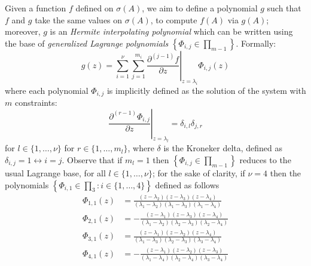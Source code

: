 Given a function $f$ defined on $\sigma(A)$, we aim to define a polynomial $g$
such that $f$ and $g$ take the same values on $\sigma(A)$, to compute $f(A)$
via $g(A)$; moreover, $g$ is an \emph{Hermite interpolating polynomial} which
can be written using the base of \textit{generalized Lagrange polynomials}
$\left\lbrace \Phi_{i,j}\in\prod_{m-1} \right\rbrace$. Formally:
\begin{displaymath}
g(z) = \sum_{i=1}^{\nu}{\sum_{j=1}^{m_{i}}{ \left.
\frac{\partial^{(j-1)}{f}}{\partial{z}} \right|_{z=\lambda_{i}}\Phi_{i,j}(z) }}
\end{displaymath}
where each polynomial $\Phi_{i,j}$ is implicitly defined as the solution of the
system with $m$ constraints:
\begin{displaymath}
    \left. \frac{\partial^{(r-1)}{\Phi_{i,j}}}{\partial{z}} \right|_{z=\lambda_{l}} = \delta_{i,l}\delta_{j,r}
\end{displaymath}
for $l\in \lbrace 1, \ldots, \nu \rbrace$ for $r \in \lbrace 1, \ldots, m_{l}
\rbrace$, where $\delta$ is the Kroneker delta, defined as $\delta_{i,j}=1
\leftrightarrow i=j$.  Observe that if $m_{l}=1$  then $\left\lbrace \Phi_{i,j}\in\prod_{m-1} \right\rbrace$
reduces to the usual Lagrange base, for all $l\in\lbrace 1, \ldots, \nu\rbrace$;
for the sake of clarity, if $\nu=4$ then the polynomials $\left\lbrace \Phi_{i,1}\in\prod_{3}:i\in\lbrace1,\ldots,4\rbrace \right\rbrace$
defined as follows
\begin{displaymath}
\begin{split}
\Phi_{ 1, 1 }{\left (z \right )} &= \frac{\left(z - \lambda_{2}\right)
\left(z - \lambda_{3}\right) \left(z - \lambda_{4}\right)}{\left(\lambda_{1} -
\lambda_{2}\right) \left(\lambda_{1} - \lambda_{3}\right) \left(\lambda_{1} -
\lambda_{4}\right)} \\ 
\Phi_{ 2, 1 }{\left (z \right )} &= - \frac{\left(z -
\lambda_{1}\right) \left(z - \lambda_{3}\right) \left(z -
\lambda_{4}\right)}{\left(\lambda_{1} - \lambda_{2}\right) \left(\lambda_{2} -
\lambda_{3}\right) \left(\lambda_{2} - \lambda_{4}\right)} \\ 
\Phi_{ 3, 1 }{\left (z \right )} &= \frac{\left(z - \lambda_{1}\right) \left(z -
\lambda_{2}\right) \left(z - \lambda_{4}\right)}{\left(\lambda_{1} -
\lambda_{3}\right) \left(\lambda_{2} - \lambda_{3}\right) \left(\lambda_{3} -
\lambda_{4}\right)} \\ 
\Phi_{ 4, 1 }{\left (z \right )} &= - \frac{\left(z -
\lambda_{1}\right) \left(z - \lambda_{2}\right) \left(z -
\lambda_{3}\right)}{\left(\lambda_{1} - \lambda_{4}\right) \left(\lambda_{2} -
\lambda_{4}\right) \left(\lambda_{3} - \lambda_{4}\right)}\\
\end{split}
\end{displaymath}
